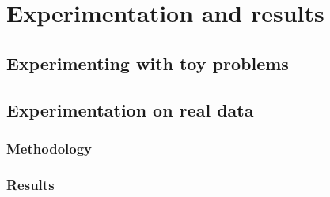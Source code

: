 
\chapter{Experimentation and results} %
\label{Chapter4}

\label{ChapterX} %

\section{Experimenting with toy problems}

\section{Experimentation on real data}

\subsection{Methodology}

\subsection{Results}
